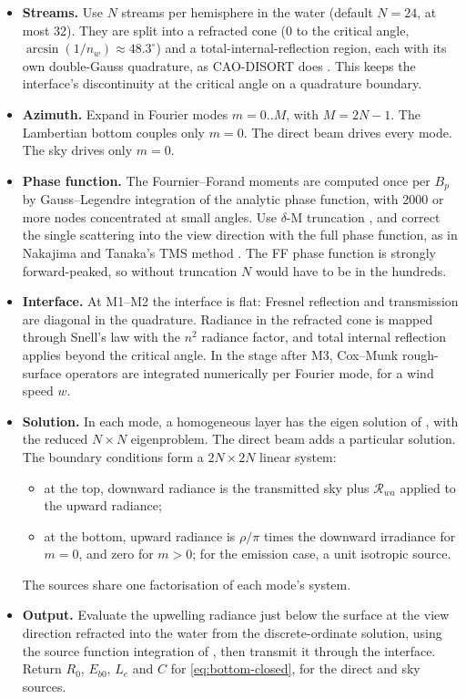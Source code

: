 \documentclass[11pt]{article}
\numberwithin{equation}{section}
\begin{document}
\begin{itemize}
\item \textbf{Streams.} Use $N$ streams per hemisphere in the water (default $N=24$, at most 32).
They are split into a refracted cone ($0$ to the critical angle, $\arcsin(1/n_w) \approx
48.3^\circ$) and a total-internal-reflection region, each with its own double-Gauss quadrature,
as CAO-DISORT does \cite{jin1994}. This keeps the interface's discontinuity at the critical
angle on a quadrature boundary.
\item \textbf{Azimuth.} Expand in Fourier modes $m = 0..M$, with $M = 2N-1$. The Lambertian
bottom couples only $m=0$. The direct beam drives every mode. The sky drives only $m=0$.
\item \textbf{Phase function.} The Fournier--Forand moments are computed once per $B_p$ by
Gauss--Legendre integration of the analytic phase function, with 2000 or more nodes
concentrated at small angles. Use $\delta$-M truncation \cite{wiscombe1977}, and correct the
single scattering into the view direction with the full phase function, as in Nakajima and
Tanaka's TMS method \cite{nakajima1988}. The FF phase function is strongly forward-peaked, so
without truncation $N$ would have to be in the hundreds.
\item \textbf{Interface.} At M1--M2 the interface is flat: Fresnel reflection and transmission
are diagonal in the quadrature. Radiance in the refracted cone is mapped through Snell's law
with the $n^2$ radiance factor, and total internal reflection applies beyond the critical
angle. In the stage after M3, Cox--Munk rough-surface operators are integrated numerically per
Fourier mode, for a wind speed $w$.
\item \textbf{Solution.} In each mode, a homogeneous layer has the eigen solution of
\cite{stamnes1988}, with the reduced $N\times N$ eigenproblem. The direct beam adds a
particular solution. The boundary conditions form a $2N\times2N$ linear system:
\begin{itemize}
\item at the top, downward radiance is the transmitted sky plus $\mathcal{R}_{wa}$ applied to
the upward radiance;
\item at the bottom, upward radiance is $\rho/\pi$ times the downward irradiance for $m=0$, and
zero for $m>0$; for the emission case, a unit isotropic source.
\end{itemize}
The sources share one factorisation of each mode's system.
\item \textbf{Output.} Evaluate the upwelling radiance just below the surface at the view
direction refracted into the water from the discrete-ordinate solution, using the source
function integration of \cite{stamnes1988}, then transmit it through the interface. Return
$R_0$, $E_{b0}$, $L_e$ and $C$ for \eqref{eq:bottom-closed}, for the direct and sky sources.
\end{itemize}
\end{document}

